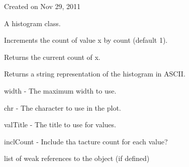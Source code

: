 \documentclass[letterpaper,10pt,english]{sphinxmanual}
\begin{document}
Created on Nov 29, 2011

\begin{fulllineitems}
\label{\detokenize{ref/util/Histogram:TotalDepth.util.Histogram.Histogram}}
A histogram class.

\begin{fulllineitems}
\label{\detokenize{ref/util/Histogram:TotalDepth.util.Histogram.Histogram.add}}
Increments the count of value x by count (default 1).

\end{fulllineitems}


\begin{fulllineitems}
\label{\detokenize{ref/util/Histogram:TotalDepth.util.Histogram.Histogram.__getitem__}}
Returns the current count of x.

\end{fulllineitems}


\begin{fulllineitems}
\label{\detokenize{ref/util/Histogram:TotalDepth.util.Histogram.Histogram.strRep}}
Returns a string representation of the histogram in ASCII.

width - The maximum width to use.

chr - The character to use in the plot.

valTitle - The title to use for values.

inclCount - Include tha tacture count for each value?

\end{fulllineitems}


\begin{fulllineitems}
\label{\detokenize{ref/util/Histogram:TotalDepth.util.Histogram.Histogram.__weakref__}}
list of weak references to the object (if defined)

\end{fulllineitems}


\end{fulllineitems}
\end{document}
